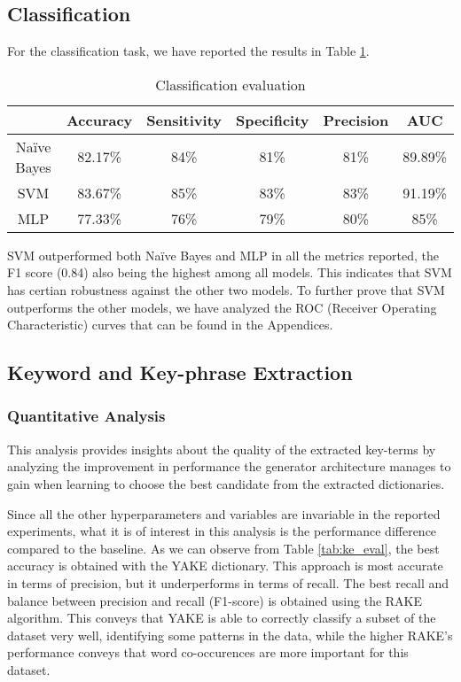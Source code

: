 \subsection{Classification}
For the classification task, we have reported the results in Table \ref{tab:evaluation}.
\begin{table}[!htb]
  \centering
    \begin{tabular}{|c|c|c|c|c|c|}
    \hline
    &Accuracy&Sensitivity&Specificity&Precision&AUC\\
    \hline
    Naïve Bayes&82.17\%&84\%&81\%&81\%&89.89\%\\
    \hline
    SVM&83.67\%&85\%&83\%&83\%&91.19\%\\
    \hline
    MLP&77.33\%&76\%&79\%&80\%&85\%\\
    \hline
    \end{tabular}
    \caption{Classification evaluation}
    \label{tab:evaluation}
\end{table}

SVM outperformed both Naïve Bayes and MLP in all the metrics reported, the F1 score (0.84) also being the highest among all models. This indicates that SVM has certian robustness against the other two models. To further prove that SVM outperforms the other models, we have analyzed the ROC (Receiver Operating Characteristic) curves that can be found in the Appendices.

\subsection{Keyword and Key-phrase Extraction}
\subsubsection{Quantitative Analysis}
This analysis provides insights about the quality of the extracted key-terms by analyzing the improvement in performance the generator architecture manages to gain when learning to choose the best candidate from the extracted dictionaries.

Since all the other hyperparameters and variables are invariable in the reported experiments, what it is of interest in this analysis is the performance difference compared to the baseline. 
As we can observe from Table \ref{tab:ke_eval}, the best accuracy is obtained with the YAKE dictionary. This approach is most accurate in terms of precision, but it underperforms in terms of recall. The best recall and balance between precision and recall (F1-score) is obtained using the RAKE algorithm. This conveys that YAKE is able to correctly classify a subset of the dataset very well, identifying some patterns in the data, while the higher RAKE's performance conveys that word co-occurences are more important for this dataset.

